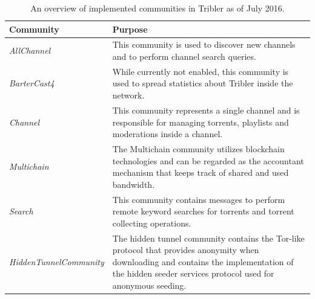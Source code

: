\begin{table}
	\begin{tabularx}{\textwidth}{|l|X|}
		\hline
		\textbf{Community} & \textbf{Purpose} \\ \hline
		\emph{AllChannel} & This community is used to discover new channels and to perform channel search queries.\\ \hline
		\emph{BarterCast4} & While currently not enabled, this community is used to spread statistics about Tribler inside the network.\\ \hline
		\emph{Channel} & This community represents a single channel and is responsible for managing torrents, playlists and moderations inside a channel.\\ \hline
		\emph{Multichain} & The Multichain community utilizes blockchain technologies and can be regarded as the accountant mechanism that keeps track of shared and used bandwidth.\\ \hline
		\emph{Search} & This community contains messages to perform remote keyword searches for torrents and torrent collecting operations.\\ \hline
		\emph{HiddenTunnelCommunity} & The hidden tunnel community contains the Tor-like protocol that provides anonymity when downloading and contains the implementation of the hidden seeder services protocol used for anonymous seeding.\\ \hline
	\end{tabularx}
	\caption{An overview of implemented communities in Tribler as of July 2016.}
	\label{table:dispersy-communities}
\end{table}

